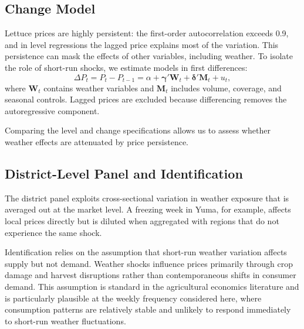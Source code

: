 \documentclass[12pt]{article}
\begin{document}
\subsection{Change Model}
\label{subsec:change_model}

Lettuce prices are highly persistent: the first-order autocorrelation exceeds 0.9, and in level regressions the lagged price explains most of the variation. This persistence can mask the effects of other variables, including weather. To isolate the role of short-run shocks, we estimate models in first differences:
\begin{equation}
\label{eq:change_model}
\Delta P_t = P_t - P_{t-1} = \alpha + \boldsymbol{\gamma}' \mathbf{W}_t + \boldsymbol{\delta}' \mathbf{M}_t + u_t,
\end{equation}
where $\mathbf{W}_t$ contains weather variables and $\mathbf{M}_t$ includes volume, coverage, and seasonal controls. Lagged prices are excluded because differencing removes the autoregressive component.

Comparing the level and change specifications allows us to assess whether weather effects are attenuated by price persistence.

\subsection{District-Level Panel and Identification}
\label{subsec:district_panel}

The district panel exploits cross-sectional variation in weather exposure that is averaged out at the market level. A freezing week in Yuma, for example, affects local prices directly but is diluted when aggregated with regions that do not experience the same shock.

Identification relies on the assumption that short-run weather variation affects supply but not demand. Weather shocks influence prices primarily through crop damage and harvest disruptions rather than contemporaneous shifts in consumer demand. This assumption is standard in the agricultural economics literature and is particularly plausible at the weekly frequency considered here, where consumption patterns are relatively stable and unlikely to respond immediately to short-run weather fluctuations.
\end{document}
